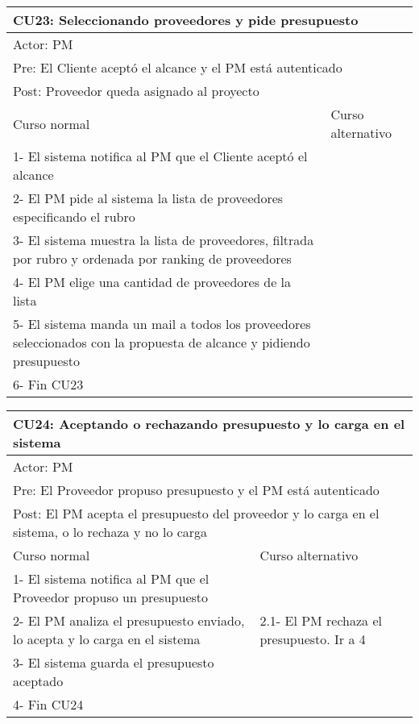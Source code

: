 \begin{table}[H]
  \begin{adjustbox}{max width = \textwidth}
  \begin{tabular}{|l|l|}
    \hline
    \multicolumn{2}{|l|}{CU23: Seleccionando proveedores y pide presupuesto} \\\hline
    \multicolumn{2}{|l|}{Actor: PM} \\\hline
    \multicolumn{2}{|l|}{Pre: El Cliente aceptó el alcance y el PM está autenticado} \\\hline
    \multicolumn{2}{|l|}{Post: Proveedor queda asignado al proyecto} \\\hline
     Curso normal & Curso alternativo\\ \hline
     1- El sistema notifica al PM que el Cliente aceptó el alcance & \\ \hline
     2- El PM pide al sistema la lista de proveedores especificando el rubro & \\ \hline
     3- El sistema muestra la lista de proveedores, filtrada por rubro y ordenada por ranking de proveedores & \\ \hline
     4- El PM elige una cantidad de proveedores de la lista & \\ \hline
     5- El sistema manda un mail a todos los proveedores seleccionados con la propuesta de alcance y pidiendo presupuesto & \\ \hline
     6- Fin CU23 & \\ \hline
 \end{tabular}
  \end{adjustbox}
\end{table}


\begin{table}[H]
  \begin{adjustbox}{max width = \textwidth}
  \begin{tabular}{|l|l|}
    \hline
    \multicolumn{2}{|l|}{CU24: Aceptando o rechazando presupuesto y lo carga en el sistema} \\\hline
    \multicolumn{2}{|l|}{Actor: PM} \\\hline
    \multicolumn{2}{|l|}{Pre: El Proveedor propuso presupuesto y el PM está autenticado} \\\hline
    \multicolumn{2}{|l|}{Post: El PM acepta el presupuesto del proveedor y lo carga en el sistema, o lo rechaza y no lo carga} \\\hline
     Curso normal & Curso alternativo\\ \hline
     1- El sistema notifica al PM que el Proveedor propuso un presupuesto & \\ \hline
     2- El PM analiza el presupuesto enviado, lo acepta y lo carga en el sistema & 2.1- El PM rechaza el presupuesto. Ir a 4 \\ \hline
     3- El sistema guarda el presupuesto aceptado & \\ \hline
     4- Fin CU24 & \\ \hline
 \end{tabular}
  \end{adjustbox}
\end{table}

